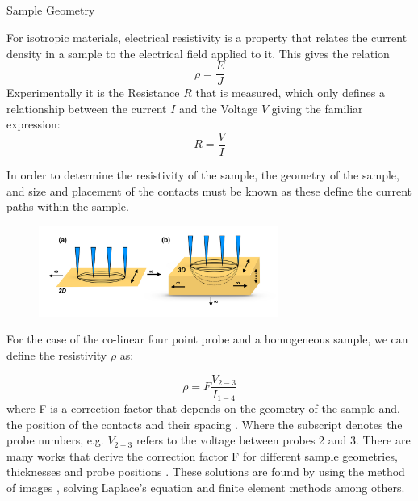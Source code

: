  \subsection{}{Sample Geometry}
 
    For isotropic materials, electrical resistivity is a property that relates the current density in a sample to the electrical field applied to it. This gives the relation \begin{equation}
        \rho = \frac{E}{J}
    \end{equation}
    Experimentally it is the Resistance $R$ that is measured, which only defines a relationship between the current $I$ and the Voltage $V$ giving the familiar expression: \begin{equation}
        R = \frac{V}{I}
    \end{equation}
    
    In order to determine the resistivity of the sample, the geometry of the sample, and size and placement of the contacts must be known as these define the current paths within the sample. 
    
    \begin{figure}[h]
        \centering
        \includegraphics[width=0.7\textwidth]{fig/4pp/4pp_current.png}
        \caption{\cite{Miccoli2015TheSystems}}
        \label{fig:4ppcurret}
    \end{figure}
    For the case of the co-linear four point probe and a homogeneous sample, we can define the resistivity $\rho$ as:
    
    \begin{equation}
    \rho = F\frac{V_{2-3}}{I_{1-4}}
    \end{equation}
    where F is a correction factor that depends on the geometry of the sample and, the position of the contacts and their spacing \cite{Miccoli2015TheSystems}. Where the subscript denotes the probe numbers, e.g. $V_{2-3}$ refers to the voltage between probes 2 and 3. There are many works that derive the correction factor F for different sample geometries, thicknesses and probe positions \cite{Smits} \cite{ValdestResistivityTransistors} \cite{Topsoe1991GeometricCorrection} \cite{}. These solutions are found by using the method of images \cite{ValdestResistivityTransistors}, solving Laplace's equation \cite{Esposito2000DeterminationCrystals} and finite element methods \cite{Zimney2007CorrectionStudy} among others. 
    

